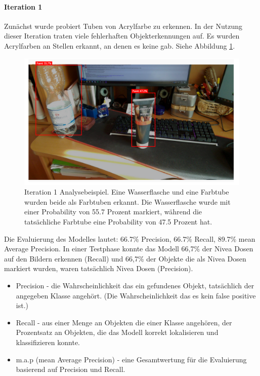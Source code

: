 \paragraph{Iteration 1}

Zunächst wurde probiert Tuben von Acrylfarbe zu erkennen. In der Nutzung dieser Iteration traten viele fehlerhaften Objekterkennungen auf. Es wurden Acrylfarben an Stellen erkannt, an denen es keine gab. Siehe Abbildung \ref{image:customVisionPaint}. 

\begin{figure}[H]
	\centering
	\includegraphics[width=1.0\textwidth]{images/customVisionPaint.PNG}
	\caption[Iteration 1 Analysebeispiel]{Iteration 1 Analysebeispiel. Eine Wasserflasche und eine Farbtube wurden beide als Farbtuben erkannt. Die Wasserflasche wurde mit einer Probability von 55.7 Prozent markiert, während die tatsächliche Farbtube eine Probability von 47.5 Prozent hat.}
	\label{image:customVisionPaint}
\end{figure}

Die Evaluierung des Modelles lautet: 66.7\% Precision, 66.7\% Recall, 89.7\% mean Average Precision.
In einer Testphase konnte das Modell 66,7\% der Nivea Dosen auf den Bildern erkennen (Recall) und 66,7\% der Objekte die als Nivea Dosen markiert wurden, waren tatsächlich Nivea Dosen (Precision).
\begin{itemize}
	\item Precision - die Wahrscheinlichkeit das ein gefundenes Objekt, tatsächlich der angegeben Klasse angehört. (Die Wahrscheinlichkeit das es kein false positive ist.)
	\item Recall - aus einer Menge an Objekten die einer Klasse angehören, der Prozentsatz an Objekten, die das Modell korrekt lokalisieren und klassifizieren konnte.
	\item m.a.p (mean Average Precision) - eine Gesamtwertung für die Evaluierung basierend auf Precision und Recall. 
\end{itemize}

